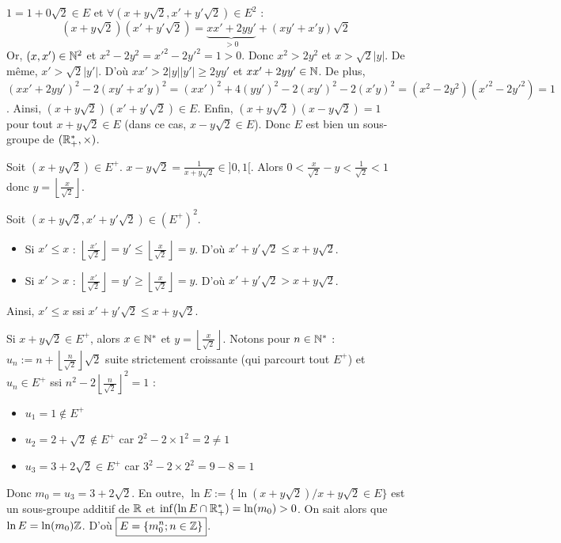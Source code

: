 \begin{solution}
$1 = 1 + 0\sqrt{2} \in E$ et $\forall (x + y\sqrt{2}, x' + y'\sqrt{2}) \in E^2$ :
\[ (x + y\sqrt{2})(x' + y'\sqrt{2}) = \underbrace{xx' + 2yy'}_{> 0} + (xy' + x'y)\sqrt{2} \]
Or, $(x,x') \in \mathbb N^2$ et $x^2 - 2y^2 = {x'}^2 - 2{y'}^2 = 1 > 0$.
Donc $x^2 > 2y^2$ et $x > \sqrt{2}|y|$. De même, $x' > \sqrt{2}|y'|$.
D'où $xx' > 2|y||y'| \geq 2yy'$ et $xx' + 2yy' \in \mathbb N$.
De plus, $(xx' + 2yy')^2 - 2(xy' + x'y)^2 = (xx')^2 + 4(yy')^2 - 2(xy')^2 - 2(x'y)^2 = (x^2 - 2y^2)({x'}^2 - 2{y'}^2) = 1$.
Ainsi, $(x + y\sqrt{2})(x' + y'\sqrt{2}) \in E$.
Enfin, $(x + y\sqrt{2})(x - y\sqrt{2}) = 1$ pour tout $x + y\sqrt{2} \in E$ (dans ce cas, $x - y\sqrt{2} \in E$).
Donc $E$ est bien un sous-groupe de $(\mathbb R_+^*, \times)$.

Soit $(x + y\sqrt{2}) \in E^+$. $x - y\sqrt{2} = \frac{1}{x + y\sqrt{2}} \in ]0, 1[$.
Alors $0 < \frac{x}{\sqrt{2}} - y < \frac{1}{\sqrt{2}} < 1$ donc $y = \left\lfloor \frac{x}{\sqrt{2}} \right\rfloor$.

Soit $(x + y\sqrt{2}, x' + y'\sqrt{2}) \in (E^+)^2$.
\begin{itemize}
  \item Si $x' \leq x$ : $\left\lfloor \frac{x'}{\sqrt{2}} \right\rfloor = y' \leq \left\lfloor \frac{x}{\sqrt{2}} \right\rfloor = y$. D'où $x' + y'\sqrt{2} \leq x + y\sqrt{2}$.
  \item Si $x' > x$ : $\left\lfloor \frac{x'}{\sqrt{2}} \right\rfloor = y' \geq \left\lfloor \frac{x}{\sqrt{2}} \right\rfloor = y$. D'où $x' + y'\sqrt{2} > x + y\sqrt{2}$.
\end{itemize}
Ainsi, $x' \leq x$ ssi $x' + y'\sqrt{2} \leq x + y\sqrt{2}$.

Si $x + y\sqrt{2} \in E^+$, alors $x \in \mathbb N^*$ et $y = \left\lfloor \frac{x}{\sqrt{2}} \right\rfloor$.
Notons pour $n \in \mathbb N^*$ : $u_n := n + \left\lfloor \frac{n}{\sqrt{2}} \right\rfloor \sqrt{2}$ suite strictement croissante (qui parcourt tout $E^+$) et $u_n \in E^+$ ssi $n^2 - 2\left\lfloor \frac{n}{\sqrt{2}} \right\rfloor^2 = 1$ :
\begin{itemize}
  \item $u_1 = 1 \notin E^+$
  \item $u_2 = 2 + \sqrt{2} \notin E^+$ car $2^2 - 2 \times 1^2 = 2 \neq 1$
  \item $u_3 = 3 + 2\sqrt{2} \in E^+$ car $3^2 - 2 \times 2^2 = 9 - 8 = 1$
\end{itemize}
Donc $m_0 = u_3 = 3 + 2\sqrt{2}$.
En outre, $\ln E := \{\ln(x + y\sqrt{2}) / x + y\sqrt{2} \in E\}$ est un sous-groupe additif de $\mathbb R$ et $\inf(\ln E \cap \mathbb R_+^*) = \ln(m_0) > 0$.
On sait alors que $\ln E = \ln(m_0)\mathbb Z$.
D'où $\boxed{E = \{m_0^n ; n \in \mathbb Z\}}$.


\end{solution}
